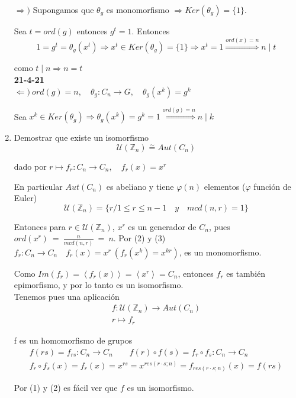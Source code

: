 \documentclass{article}
\begin{document}
\begin{enumerate}[(1)]
$\Rightarrow)$ Supongamos que $\theta_g$ es monomorfismo $\Rightarrow Ker(\theta_g)=\{1\}$. 

Sea $t=ord(g)$ entonces $g^t=1$. Entonces
\begin{equation*}
1=g^t=\theta_g(x^t)\Rightarrow x^t\in Ker(\theta_g)=\{1\}\Rightarrow x^t=1 \overset{ord(x)=n}{\Rightarrow} n\mid t
\end{equation*}

como $t\mid n\Rightarrow n=t$ \\

\textbf{21-4-21} \\

$\Leftarrow)\:ord(g)=n, \quad \theta_g:C_n\longrightarrow G,\quad \theta_g(x^k)=g^k$

Sea $x^k\in Ker(\theta_g)\Rightarrow \theta_g(x^k)=g^k=1\overset{ord(g)=n}{\Rightarrow} n\mid k$

\item Demostrar que existe un isomorfismo
\begin{equation*}
\mathcal{U}(\mathbb{Z}_n)\overset{\sim}{=} Aut(C_n)
\end{equation*}

dado por $r\longmapsto f_r:C_n\longrightarrow C_n,\quad f_r(x)=x^r$

En particular $Aut(C_n)$ es abeliano y tiene $\varphi(n)$ elementos ($\varphi$ función de Euler)
\begin{equation*}
\mathcal{U}(\mathbb{Z}_n)=\{r/1\leq r\leq n-1\quad y\quad mcd(n,r)=1\}
\end{equation*}

Entonces para $r\in \mathcal{U}(\mathbb{Z}_n)$, $x^r$ es un generador de $C_n$, pues $ord(x^r)~=~\frac{n}{mcd(n,r)}~=~n$. Por (2) y (3) $f_r:C_n\longrightarrow C_n \quad f_r(x)=x^r\:(f_r(x^k)=x^{kr})$, es un monomorfismo. 

Como $Im(f_r)=\left\langle f_r(x)\right\rangle =\left\langle x^r\right\rangle =C_n$, entonces $f_r$ es también epimorfismo, y por lo tanto es un isomorfismo. \\

Tenemos pues una aplicación 
\begin{gather*}
f:\mathcal{U}(\mathbb{Z}_n)\longrightarrow Aut(C_n) \\
r\longmapsto f_r
\end{gather*}

f es un homomorfismo de grupos
\begin{gather*}
f(rs)=f_{rs}:C_n\longrightarrow C_n \qquad
f(r)\circ f(s)=f_r\circ f_s: C_n\longrightarrow C_n \\
f_r\circ f_s(x)=f_r(x)=x^{rs}=x^{res(r\cdot s;n)}=f_{res(r\cdot s;n)}(x)=f(rs)
\end{gather*}

Por (1) y (2) es fácil ver que $f$ es un isomorfismo.
\end{enumerate}
\end{document}
